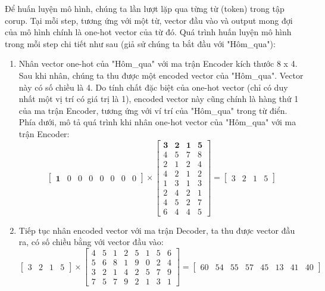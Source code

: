 Để huấn luyện mô hình, chúng ta lần lượt lặp qua từng từ (token) trong tập corup. Tại mỗi step, tương ứng với một từ, vector đầu vào và output mong đợi của mô hình chính là one-hot vector của từ đó. Quá trình huấn luyện mô hình trong mỗi step chi tiết như sau (giả sử chúng ta bắt đầu với "Hôm\_qua"):
\begin{enumerate}
    \item Nhân vector one-hot của "Hôm\_qua" với ma trận Encoder kích thước 8 x 4. Sau khi nhân, chúng ta thu được một encoded vector của "Hôm\_qua". Vector này có số chiều là 4. Do tính chất đặc biệt của one-hot vector (chỉ có duy nhất một vị trí có giá trị là 1), encoded vector này cũng chính là hàng thứ 1 của ma trận Encoder, tương ứng với ví trí của "Hôm\_qua" trong từ điển. Phía dưới, mô tả quá trình khi nhân one-hot vector của "Hôm\_qua" với ma trận Encoder:
    \begin{displaymath}
        \begin{bmatrix}
        \boldsymbol{1} & 0 & 0 & 0 & 0 & 0 & 0 & 0
        \end{bmatrix} \times
        \begin{bmatrix}
         \boldsymbol{3} & \boldsymbol{2} & \boldsymbol{1} & \boldsymbol{5} \\
         4 & 5 & 7 & 8 \\
         2 & 1 & 2 & 4 \\
         4 & 2 & 1 & 2 \\
         1 & 3 & 1 & 3 \\
         2 & 4 & 2 & 1 \\
         4 & 5 & 2 & 7 \\
         6 & 4 & 4 & 5
        \end{bmatrix} =
        \begin{bmatrix}
        3 & 2 & 1 & 5
        \end{bmatrix}
    \end{displaymath}

    \item Tiếp tục nhân encoded vector với ma trận Decoder, ta thu được vector đầu ra, có số chiều bằng với vector đầu vào:
    \begin{displaymath}
        \begin{bmatrix}
        3 & 2 & 1 & 5
        \end{bmatrix} \times
        \begin{bmatrix}
        4 & 5 & 1 & 2 & 5 & 1 & 5 & 6 \\
        5 & 6 & 8 & 1 & 9 & 0 & 2 & 4 \\
        3 & 2 & 1 & 4 & 2 & 5 & 7 & 9 \\
        7 & 5 & 7 & 9 & 2 & 1 & 3 & 1
        \end{bmatrix} =
        \begin{bmatrix}
        60 & 54 & 55 & 57 & 45 & 13 & 41 & 40
        \end{bmatrix}
    \end{displaymath}


\end{enumerate}
